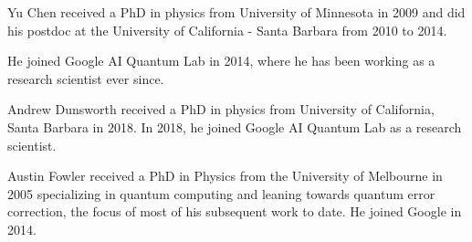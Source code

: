 \documentclass[journal]{IEEEtran}
\begin{document}
\begin{IEEEbiography}{Yu Chen} received a PhD in physics from University of Minnesota in 2009 and did his postdoc at the University of California - Santa Barbara from 2010 to 2014. 

He joined Google AI Quantum Lab in 2014, where he has been working as a research scientist ever since.

\end{IEEEbiography}
\begin{IEEEbiography}{Andrew Dunsworth} received a PhD in physics from University of California, Santa Barbara in 2018. In 2018, he joined Google AI Quantum Lab as a research scientist.


\end{IEEEbiography}
\begin{IEEEbiography}{Austin Fowler} received a PhD in Physics from the University of Melbourne in 2005 specializing in quantum computing and leaning towards quantum error correction, the focus of most of his subsequent work to date. He joined Google in 2014.


\end{IEEEbiography}
\end{document}
